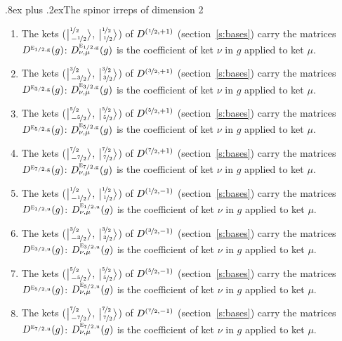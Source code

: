 \documentclass[10pt,a4paper]{article}
\makeatletter
\renewcommand\subsection{\@startsection{subsection}{2}{\z@}{-2.5ex plus -1ex minus -.2ex}%
  {.8ex plus .2ex}{\normalfont\sffamily\bfseries\color{parttitle}}}
\numberwithin{equation}{section}
\newcommand{\irr}[1]{\text{\normalfont\scshape #1}}
\newcommand{\ptag}[1]{\mathrm{#1}}
\newcommand{\irrJp}[2]{D^{(#1,#2)}}
\newcommand{\repD}[1]{D^{#1}}
\newcommand{\intx}{\mu}
\newcommand{\jm}[2]{\bigl\lvert{}^{#1}_{\,#2}\bigr\rangle}
\newenvironment{romanlist}{\begin{enumerate}%
\renewcommand{\labelenumi}{(\roman{enumi})}}%
  {\end{enumerate}}
\makeatother
\begin{document}
\subsection{The spinor irreps of dimension 2}
\begin{romanlist}\raggedright
\item The kets ($\jm{\nicefrac{1}{2}}{-\nicefrac{1}{2}}$, $\jm{\nicefrac{1}{2}}{\nicefrac{1}{2}}$) of $\irrJp{\nicefrac{1}{2}}{+1}$ (section~\ref{s:bases}) carry the matrices $\repD{\irr{e}_{1/2,\ptag{g}}}(g)$: $\repD{\irr{e}_{1/2,\ptag{g}}}_{\nu,\intx}(g)$ is the coefficient of ket $\nu$ in $g$ applied to ket $\intx$.
\item The kets ($\jm{\nicefrac{3}{2}}{-\nicefrac{3}{2}}$, $\jm{\nicefrac{3}{2}}{\nicefrac{3}{2}}$) of $\irrJp{\nicefrac{3}{2}}{+1}$ (section~\ref{s:bases}) carry the matrices $\repD{\irr{e}_{3/2,\ptag{g}}}(g)$: $\repD{\irr{e}_{3/2,\ptag{g}}}_{\nu,\intx}(g)$ is the coefficient of ket $\nu$ in $g$ applied to ket $\intx$.
\item The kets ($\jm{\nicefrac{5}{2}}{-\nicefrac{5}{2}}$, $\jm{\nicefrac{5}{2}}{\nicefrac{5}{2}}$) of $\irrJp{\nicefrac{5}{2}}{+1}$ (section~\ref{s:bases}) carry the matrices $\repD{\irr{e}_{5/2,\ptag{g}}}(g)$: $\repD{\irr{e}_{5/2,\ptag{g}}}_{\nu,\intx}(g)$ is the coefficient of ket $\nu$ in $g$ applied to ket $\intx$.
\item The kets ($\jm{\nicefrac{7}{2}}{-\nicefrac{7}{2}}$, $\jm{\nicefrac{7}{2}}{\nicefrac{7}{2}}$) of $\irrJp{\nicefrac{7}{2}}{+1}$ (section~\ref{s:bases}) carry the matrices $\repD{\irr{e}_{7/2,\ptag{g}}}(g)$: $\repD{\irr{e}_{7/2,\ptag{g}}}_{\nu,\intx}(g)$ is the coefficient of ket $\nu$ in $g$ applied to ket $\intx$.
\item The kets ($\jm{\nicefrac{1}{2}}{-\nicefrac{1}{2}}$, $\jm{\nicefrac{1}{2}}{\nicefrac{1}{2}}$) of $\irrJp{\nicefrac{1}{2}}{-1}$ (section~\ref{s:bases}) carry the matrices $\repD{\irr{e}_{1/2,\ptag{u}}}(g)$: $\repD{\irr{e}_{1/2,\ptag{u}}}_{\nu,\intx}(g)$ is the coefficient of ket $\nu$ in $g$ applied to ket $\intx$.
\item The kets ($\jm{\nicefrac{3}{2}}{-\nicefrac{3}{2}}$, $\jm{\nicefrac{3}{2}}{\nicefrac{3}{2}}$) of $\irrJp{\nicefrac{3}{2}}{-1}$ (section~\ref{s:bases}) carry the matrices $\repD{\irr{e}_{3/2,\ptag{u}}}(g)$: $\repD{\irr{e}_{3/2,\ptag{u}}}_{\nu,\intx}(g)$ is the coefficient of ket $\nu$ in $g$ applied to ket $\intx$.
\item The kets ($\jm{\nicefrac{5}{2}}{-\nicefrac{5}{2}}$, $\jm{\nicefrac{5}{2}}{\nicefrac{5}{2}}$) of $\irrJp{\nicefrac{5}{2}}{-1}$ (section~\ref{s:bases}) carry the matrices $\repD{\irr{e}_{5/2,\ptag{u}}}(g)$: $\repD{\irr{e}_{5/2,\ptag{u}}}_{\nu,\intx}(g)$ is the coefficient of ket $\nu$ in $g$ applied to ket $\intx$.
\item The kets ($\jm{\nicefrac{7}{2}}{-\nicefrac{7}{2}}$, $\jm{\nicefrac{7}{2}}{\nicefrac{7}{2}}$) of $\irrJp{\nicefrac{7}{2}}{-1}$ (section~\ref{s:bases}) carry the matrices $\repD{\irr{e}_{7/2,\ptag{u}}}(g)$: $\repD{\irr{e}_{7/2,\ptag{u}}}_{\nu,\intx}(g)$ is the coefficient of ket $\nu$ in $g$ applied to ket $\intx$.
\end{romanlist}
\end{document}
